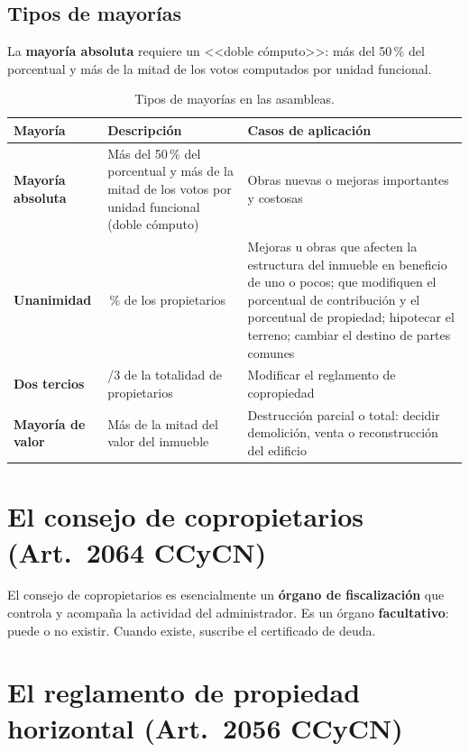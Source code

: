 \documentclass[12pt,oneside]{book}
\begin{document}
\subsection{Tipos de mayorías}

La \textbf{mayoría absoluta} requiere un <<doble cómputo>>: más del 50\,\% del porcentual y más de la mitad de los votos computados por unidad funcional.

\begin{table}[H]
\centering
\begin{tabularx}{\textwidth}{
    >{\raggedright\arraybackslash}p{}
    >{\raggedright\arraybackslash}X
    >{\raggedright\arraybackslash}X
}
\toprule
\textbf{Mayoría} & \textbf{Descripción} & \textbf{Casos de aplicación} \\
\midrule
\textbf{Mayoría absoluta} & Más del 50\,\% del porcentual y más de la mitad de los votos por unidad funcional (doble cómputo) & Obras nuevas o mejoras importantes y costosas \\
\textbf{Unanimidad} & 100\,\% de los propietarios & Mejoras u obras que afecten la estructura del inmueble en beneficio de uno o pocos; que modifiquen el porcentual de contribución y el porcentual de propiedad; hipotecar el terreno; cambiar el destino de partes comunes \\
\textbf{Dos tercios} & 2/3 de la totalidad de propietarios & Modificar el reglamento de copropiedad \\
\textbf{Mayoría de valor} & Más de la mitad del valor del inmueble & Destrucción parcial o total: decidir demolición, venta o reconstrucción del edificio \\
\bottomrule
\end{tabularx}
\caption{Tipos de mayorías en las asambleas.}
\end{table}

\section{El consejo de copropietarios (Art.~2064 CCyCN)}

El consejo de copropietarios es esencialmente un \textbf{órgano de fiscalización} que controla y acompaña la actividad del administrador. Es un órgano \textbf{facultativo}: puede o no existir. Cuando existe, suscribe el certificado de deuda.

\section{El reglamento de propiedad horizontal (Art.~2056 CCyCN)}
\end{document}
